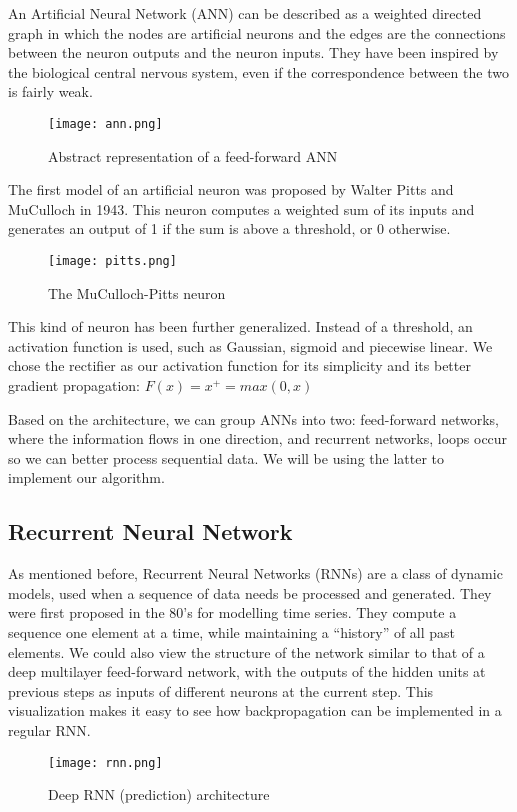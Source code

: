 \documentclass[../Thesis.tex]{subfiles}
\begin{document}
An Artificial Neural Network (ANN) can be described as a weighted directed graph in which the nodes are artificial neurons and the edges are the connections between the neuron outputs and the neuron inputs. They have been inspired by the biological central nervous system, even if the correspondence between the two is fairly weak.
\begin{figure}[h]
\centering
\label {fig: ann}
\texttt{[image: ann.png]}
\caption[width=0.5\textwidth]{Abstract representation of a feed-forward ANN}
\end{figure}

The first model of an artificial neuron was proposed by Walter Pitts and MuCulloch in 1943. This neuron computes a weighted sum of its inputs and generates an output of 1 if the sum is above a threshold, or 0 otherwise. 
\begin{figure}[h]
\centering
\label {fig: pitt}
\texttt{[image: pitts.png]}
\caption[width=0.5\textwidth]{The MuCulloch-Pitts neuron}
\end{figure}

This kind of neuron has been further generalized. Instead of a threshold, an activation function is used, such as Gaussian, sigmoid and piecewise linear. We chose the rectifier as our activation function for its simplicity and its better gradient propagation:
$F(x) = x_{}^{+} = max(0, x)$

Based on the architecture, we can group ANNs into two: feed-forward networks, where the information flows in one direction, and recurrent networks, loops occur so we can better process sequential data. We will be using the latter to implement our algorithm.


\subsection {Recurrent Neural Network}

As mentioned before, Recurrent Neural Networks (RNNs) are a class of dynamic models, used when a sequence of data needs be processed and generated. They were first proposed in the 80’s for modelling time series. They compute a sequence one element at a time, while maintaining a “history” of all past elements. We could also view the structure of the network similar to that of a deep multilayer feed-forward network, with the outputs of the hidden units at previous steps as inputs of different neurons at the current step. This visualization makes it easy to see how backpropagation can be implemented in a regular RNN.
\begin{figure}[h]
\centering
\label {fig: rnn}
\texttt{[image: rnn.png]}
\caption[width=0.5\textwidth]{Deep RNN (prediction) architecture}
\end{figure}
\end{document}
